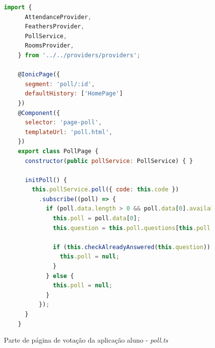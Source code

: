 \begin{figure}[!ht]
  \caption{Parte de página de votação da aplicação aluno - \textit{poll.ts}}
  \label{fig:ionic_pollpage}
  \begin{lstlisting}[language=JavaScript]
    import {
      AttendanceProvider,
      FeathersProvider,
      PollService,
      RoomsProvider,
    } from '../../providers/providers';

    @IonicPage({
      segment: 'poll/:id',
      defaultHistory: ['HomePage']
    })
    @Component({
      selector: 'page-poll',
      templateUrl: 'poll.html',
    })
    export class PollPage {
      constructor(public pollService: PollService) { }

      initPoll() {
        this.pollService.poll({ code: this.code })
          .subscribe((poll) => {
            if (poll.data.length > 0 && poll.data[0].available !== -1) {
              this.poll = poll.data[0];
              this.question = this.poll.questions[this.poll.available];

              if (this.checkAlreadyAnswered(this.question)) {
                this.poll = null;
              }
            } else {
              this.poll = null;
            }
          });
      }
    }
  \end{lstlisting}
\doautor
\end{figure}


